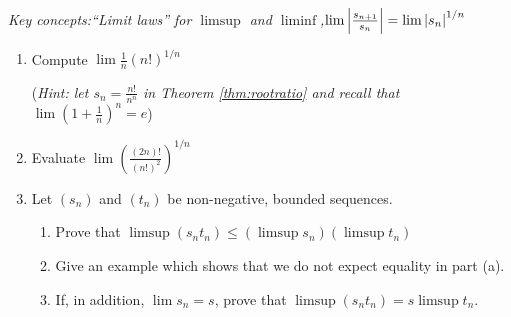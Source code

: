 \begin{exercises}{}{}
	\emph{Key concepts:\quad ``Limit laws'' for $\limsup$ and $\liminf$,\quad $\lim\left| \frac{s_{n+1}}{s_n}\right|=\lim\left| s_n\right|^{1/n}$}
	
	\begin{enumerate}
  	\item Compute $\lim \frac 1n(n!)^{1/n}$\par
		(\emph{Hint: let $s_n=\frac{n!}{n^n}$ in Theorem \ref{thm:rootratio} and recall that $\lim\left(1+\frac 1n\right)^n=e$})
  
  	\item Evaluate $\lim\left(\frac{(2n)!}{(n!)^2}\right)^{1/n}$
  
  	\item\label{exs:limsupprod} Let $(s_n)$ and $(t_n)$ be non-negative, bounded sequences.
		\begin{enumerate}
			\item Prove that $\limsup(s_nt_n)\le\left(\limsup s_n\right)\left(\limsup t_n\right)$
			\item Give an example which shows that we do not expect equality in part (a).
			\item If, in addition, $\lim s_n=s$, prove that $\limsup(s_nt_n)=s\limsup t_n$.
		\end{enumerate}
% 	



\end{enumerate}
\end{exercises}

